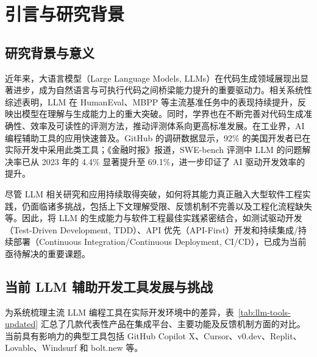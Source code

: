 
\chapter{引言与研究背景}

\section{研究背景与意义}
近年来，大语言模型（Large Language Models, LLMs）在代码生成领域展现出显著进步，成为自然语言与可执行代码之间桥梁能力提升的重要驱动力。相关系统性综述表明，LLM 在 HumanEval、MBPP 等主流基准任务中的表现持续提升，反映出模型在理解与生成能力上的重大突破\cite{jiang2024survey}。同时，学界也在不断完善对代码生成准确性、效率及可读性的评测方法，推动评测体系向更高标准发展\cite{chen2024eval}。在工业界，AI 编程辅助工具的应用快速普及。GitHub 的调研数据显示，92\% 的美国开发者已在实际开发中采用此类工具\cite{githubblog2023}；《金融时报》报道，SWE-bench 评测中 LLM 的问题解决率已从 2023 年的 4.4\% 显著提升至 69.1\%，进一步印证了 AI 驱动开发效率的提升\cite{ft2025ai}。

尽管 LLM 相关研究和应用持续取得突破，如何将其能力真正融入大型软件工程实践，仍面临诸多挑战，包括上下文理解受限、反馈机制不完善以及工程化流程缺失等。因此，将 LLM 的生成能力与软件工程最佳实践紧密结合，如测试驱动开发（Test-Driven Development, TDD）、API 优先（API-First）开发和持续集成/持续部署（Continuous Integration/Continuous Deployment, CI/CD），已成为当前亟待解决的重要课题。

\section{当前 LLM 辅助开发工具发展与挑战}

为系统梳理主流 LLM 编程工具在实际开发环境中的差异，表~\ref{tab:llm-tools-updated} 汇总了几款代表性产品在集成平台、主要功能及反馈机制方面的对比。当前具有影响力的典型工具包括 GitHub Copilot X、Cursor、v0.dev、Replit、Lovable、Windsurf 和 bolt.new 等。


